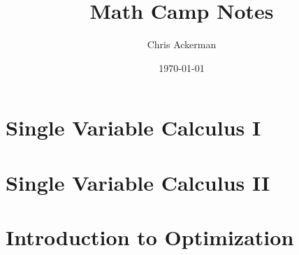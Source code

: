 \documentclass[11pt]{article}
\author{Chris Ackerman}
\date{\today}
\title{Math Camp Notes}
\begin{document}
\maketitle
\tableofcontents

\maketitle

\section{Single Variable Calculus I}
\label{sec:org9c9ec11}
\section{Single Variable Calculus II}
\label{sec:org0fbc602}
\section{Introduction to Optimization}
\label{sec:orgb4b74d7}
\end{document}
